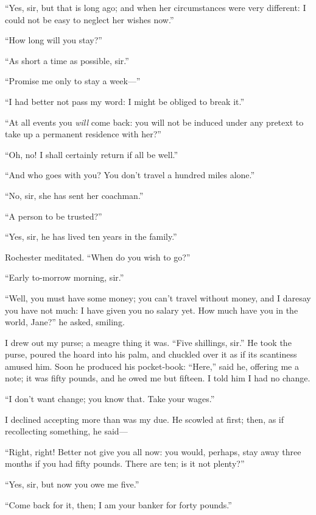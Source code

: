 \enquote{Yes, sir, but that is long ago; and when her circumstances were
	very different: I could not be easy to neglect her wishes now.}

\enquote{How long will you stay?}

\enquote{As short a time as possible, sir.}

\enquote{Promise me only to stay a week---}

\enquote{I had better not pass my word: I might be obliged to break it.}

\enquote{At all events you \emph{will} come back: you will not be induced under
	any pretext to take up a permanent residence with her?}

\enquote{Oh, no! I shall certainly return if all be well.}

\enquote{And who goes with you? You don't travel a hundred miles
	alone.}

\enquote{No, sir, she has sent her coachman.}

\enquote{A person to be trusted?}

\enquote{Yes, sir, he has lived ten years in the family.}

\Mr{} Rochester meditated. \enquote{When do you wish to go?}

\enquote{Early to-morrow morning, sir.}

\enquote{Well, you must have some money; you can't travel without money,
	and I daresay you have not much: I have given you no salary yet. How
	much have you in the world, Jane?} he asked, smiling.

I drew out my purse; a meagre thing it was. \enquote{Five shillings,
	sir.} He took the purse, poured the hoard into his palm, and chuckled
over it as if its scantiness amused him. Soon he produced his
pocket-book: \enquote{Here,} said he, offering me a note; it was fifty
pounds, and he owed me but fifteen. I told him I had no change.

\enquote{I don't want change; you know that. Take your wages.}

I declined accepting more than was my due. He scowled at first; then,
as if recollecting something, he said---

\enquote{Right, right! Better not give you all now: you would, perhaps,
	stay away three months if you had fifty pounds. There are ten; is it
	not plenty?}

\enquote{Yes, sir, but now you owe me five.}

\enquote{Come back for it, then; I am your banker for forty pounds.}

